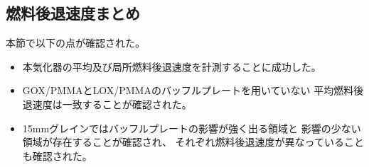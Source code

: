 \subsection{燃料後退速度まとめ}
本節で以下の点が確認された。
\begin{itemize}
\item 本気化器の平均及び局所燃料後退速度を計測することに成功した。
\item GOX/PMMAとLOX/PMMAのバッフルプレートを用いていない
平均燃料後退速度は一致することが確認された。
\item 15mmグレインではバッフルプレートの影響が強く出る領域と
影響の少ない領域が存在することが確認され、
それぞれ燃料後退速度が異なっていることも確認された。
\end{itemize}

